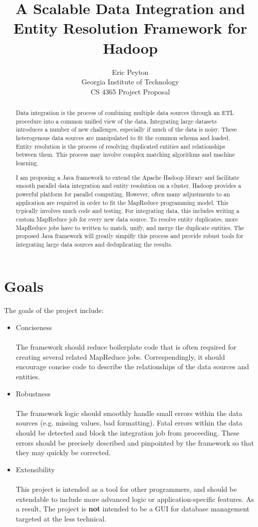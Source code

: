 \documentclass[12pt]{article}
\title{A Scalable Data Integration and Entity Resolution Framework for Hadoop}
\author{Eric Peyton\\
\small Georgia Institute of Technology\\
\small CS 4365 Project Proposal\\
}
\begin{document}
\maketitle

\begin{abstract}
Data integration is the process of combining multiple data sources through an ETL procedure into a common unified view of the data. Integrating large datasets introduces a number of new challenges, especially if much of the data is noisy. These heterogenous data sources are manipulated to fit the common schema and loaded. Entity resolution is the process of resolving duplicated entities and relationships between them. This process may involve complex matching algorithms and machine learning.

I am proposing a Java framework to extend the Apache Hadoop library and facilitate smooth parallel data integration and entity resolution on a cluster. Hadoop provides a powerful platform for parallel computing. However, often many adjustments to an application are required in order to fit the MapReduce programming model. This typically involves much code and testing. For integrating data, this includes writing a custom MapReduce job for every new data source. To resolve entity duplicates, more MapReduce jobs have to written to match, unify, and merge the duplicate entities. The proposed Java framework will greatly simpifly this process and provide robust tools for integrating large data sources and deduplicating the results.
\end{abstract}
\section{Goals}
The goals of the project include:
\begin{itemize}
    \item Conciseness\\\\
    The framework should reduce boilerplate code that is often required for creating several related MapReduce jobs. Correspendingly, it should encourage concise code to describe the relationships of the data sources and entities. 

    \item Robustness\\\\
    The framework logic should smoothly handle small errors within the data sources (e.g. missing values, bad formatting). Fatal errors within the data should be detected and block the integration job from proceeding. These errors should be precisely described and pinpointed by the framework so that they may quickly be corrected.
    \item Extensibility\\\\
    This project is intended as a tool for other programmers, and should be extendable to include more advanced logic or application-specific features. As a result, The project is {\bf not} intended to be a GUI for database management targeted at the less technical.
\end{itemize}
\end{document}
